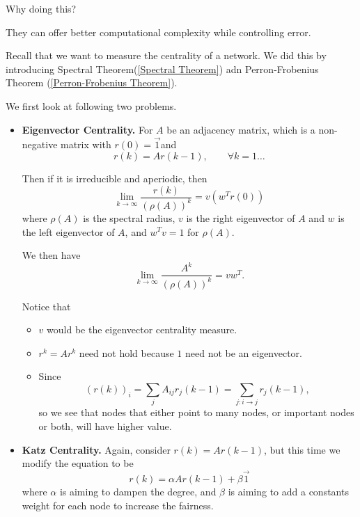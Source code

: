 \begin{problem}
Why doing this?
\end{problem}
\begin{answer}
	They can offer better computational complexity while controlling error.
\end{answer}

\begin{problem}
Recall that we want to measure the centrality of a network. We did this by introducing Spectral Theorem(\autoref{Spectral Theorem}) adn
Perron-Frobenius Theorem (\autoref{Perron-Frobenius Theorem}).

We first look at following two problems.
\begin{itemize}
	\item \textbf{Eigenvector Centrality.} For \(A\) be an adjacency matrix, which is a non-negative matrix with \(r(0) = \vec{1}\)and
	      \[
		      r(k) = Ar(k - 1), \qquad \forall k = 1\ldots
	      \]

	      Then if it is irreducible and aperiodic, then
	      \[
		      \lim_{k\to \infty } \frac{r(k)}{(\rho(A))^k} = v(w^{T} r(0))
	      \]
	      where \(\rho(A)\) is the spectral radius, \(v\) is the right eigenvector of \(A\) and \(w\) is the left eigenvector of \(A\), and \(w^{T}v = 1\) for \(\rho(A)\).

	      We then have
	      \[
		      \lim_{k\to \infty}\frac{A^k}{(\rho(A))^k} = vw^{T}.
	      \]

	      \begin{remark}
		      Notice that
		      \begin{itemize}
			      \item \(v\) would be the eigenvector centrality measure.
			      \item \(r^k = A r^k\) need not hold because \(1\) need not be an eigenvector.
			      \item Since
			            \[
				            (r(k))_i = \sum\limits_{j} A_{ij}r_{j}(k - 1) = \sum\limits_{j:i\to j} r_j(k-1),
			            \]
			            so we see that nodes that either point to many nodes, or important nodes or both, will have higher value.
		      \end{itemize}
	      \end{remark}
	\item \textbf{Katz Centrality.} Again, consider \(r(k) = Ar(k - 1)\), but this time we modify the equation to be
	      \[
		      r(k) = \alpha Ar(k - 1) + \beta \vec{1}
	      \]
	      where \(\alpha\) is aiming to dampen the degree, and \(\beta\) is aiming to add a constants weight for each node to increase the fairness.


\end{itemize}
\end{problem}
